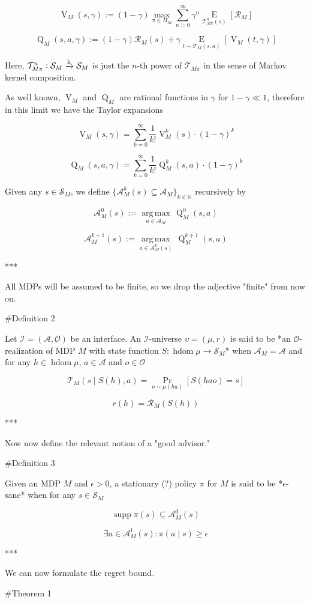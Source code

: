 \documentclass[a4paper]{article}
\DeclareMathOperator{\Supp}{supp}
\newcommand{\E}[1]{\underset{#1}{\operatorname{E}}}
\newcommand{\Argmax}[1]{\underset{#1}{\operatorname{arg\,max}}\,}
\newcommand{\Nats}{\mathbb{N}}
\newcommand{\Sq}[2]{\{#1\}_{#2 \in \Nats}}
\newcommand{\M}{\xrightarrow{\textnormal{k}}}
\newcommand{\Ob}{\mathcal{O}}
\newcommand{\A}{\mathcal{A}}
\newcommand{\St}{\mathcal{S}}
\newcommand{\T}{\mathcal{T}}
\newcommand{\R}{\mathcal{R}}
\newcommand{\In}{\mathcal{I}}
\DeclareMathOperator{\HD}{hdom}
\newcommand{\V}{\operatorname{V}}
\newcommand{\Q}{\operatorname{Q}}
\begin{document}
$$\V_M(s,\gamma):=(1-\gamma)\max_{\pi \in \Pi_M} \sum_{n=0}^\infty \gamma^n \E{\T_{M\pi}^n(s)}\left[\R_M\right]$$

$$\Q_M(s,a,\gamma):=(1-\gamma)\R_M(s)+\gamma\E{t \sim \T_M(s,a)}\left[\V_M(t,\gamma)\right]$$

Here, $\T_{M\pi}^n: \St_M \M \St_M$ is just the $n$-th power of $\T_{M\pi}$ in the sense of Markov kernel composition.

As well known, $\V_M$ and $\Q_M$ are rational functions in $\gamma$ for $1-\gamma \ll 1$, therefore in this limit we have the Taylor expansions

$$\V_M(s,\gamma)=\sum_{k=0}^\infty {\frac{1}{k!} \V_M^k(s)\cdot(1-\gamma)^k}$$

$$\Q_M(s,a,\gamma)=\sum_{k=0}^\infty {\frac{1}{k!} \Q_M^k(s,a)\cdot(1-\gamma)^k}$$

Given any $s \in \St_M$, we define $\Sq{\A_M^k(s) \subseteq \A_M}{k}$ recursively by

$$\A^0_M(s) := \Argmax{a \in \A_M} \Q_M^0(s,a)$$

$$\A^{k+1}_M(s) := \Argmax{a \in \A_M^k(s)} \Q_M^{k+1}(s,a)$$

***

All MDPs will be assumed to be finite, so we drop the adjective "finite" from now on.

\#Definition 2

Let $\In=(\A,\Ob)$ be an interface. An $\In$-universe $\upsilon=(\mu,r)$ is said to be *an $\Ob$-realization of MDP $M$ with state function $S: \HD{\mu} \rightarrow \St_M$* when $\A_M=\A$ and for any $h \in \HD{\mu}$, $a \in \A$ and $o \in \Ob$

$$\T_M\left(s \mid S(h),a\right) =\Pr_{o \sim \mu(ha)}\left[S(hao)=s\right]$$

$$r(h)=\R_M\left(S(h)\right)$$

***

Now now define the relevant notion of a "good advisor."

\#Definition 3

Given an MDP $M$ and $\epsilon > 0$, a stationary (?) policy $\pi$ for $M$ is said to be *$\epsilon$-sane* when for any $s \in \St_M$

$$\Supp{\pi(s)} \subseteq \A_M^0(s)$$

$$\exists a \in \A_M^1(s): \pi(a \mid s) \geq \epsilon$$

***


We can now formulate the regret bound.

\#Theorem 1
\end{document}
